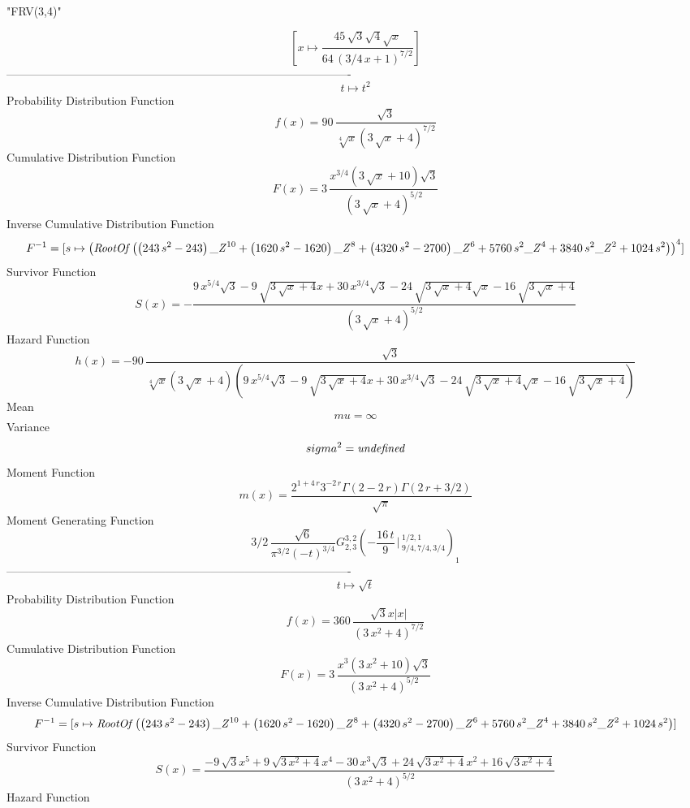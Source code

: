 \documentclass[12pt]{article}
\begin{document}
 
                                 "FRV(3,4)"

$$[x\mapsto {\frac {45\,\sqrt {3}\sqrt {4}\sqrt {x}}{64\, \left( 3/4\,x+
1 \right) ^{7/2}}}]
$$-------------------------------------------------------------------------------------------  \\$$t\mapsto {t}^{2}
$$Probability Distribution Function 
$$  f(x)=90\,{\frac {\sqrt {3}}{\sqrt [4]{x} \left( 3\,\sqrt {x}+4 \right) ^{7/
2}}}
$$Cumulative Distribution Function  
 $$F(x)=3\,{\frac {{x}^{3/4} \left( 3\,\sqrt {x}+10 \right) \sqrt {3}}{
 \left( 3\,\sqrt {x}+4 \right) ^{5/2}}}
$$ Inverse Cumulative Distribution Function 
  $$F^{-1} = [s\mapsto  \left( {\it RootOf} \left(  \left( 243\,{s}^{2}-243
 \right) {{\it \_Z}}^{10}+ \left( 1620\,{s}^{2}-1620 \right) {{\it \_Z
}}^{8}+ \left( 4320\,{s}^{2}-2700 \right) {{\it \_Z}}^{6}+5760\,{s}^{2
}{{\it \_Z}}^{4}+3840\,{s}^{2}{{\it \_Z}}^{2}+1024\,{s}^{2} \right) 
 \right) ^{4}]
$$Survivor Function 
 $$ S(x)=-{\frac {9\,{x}^{5/4}\sqrt {3}-9\,\sqrt {3\,\sqrt {x}+4}x+30\,{x}^{3/4
}\sqrt {3}-24\,\sqrt {3\,\sqrt {x}+4}\sqrt {x}-16\,\sqrt {3\,\sqrt {x}
+4}}{ \left( 3\,\sqrt {x}+4 \right) ^{5/2}}}
$$ Hazard Function 
 $$ h(x)=-90\,{\frac {\sqrt {3}}{\sqrt [4]{x} \left( 3\,\sqrt {x}+4 \right) 
 \left( 9\,{x}^{5/4}\sqrt {3}-9\,\sqrt {3\,\sqrt {x}+4}x+30\,{x}^{3/4}
\sqrt {3}-24\,\sqrt {3\,\sqrt {x}+4}\sqrt {x}-16\,\sqrt {3\,\sqrt {x}+
4} \right) }}
$$Mean 
 $$ mu=\infty 
$$ Variance 
 $$ sigma^2 = {\it undefined}
$$Moment Function 
 $$ m(x) = {\frac {{2}^{1+4\,r}{3}^{-2\,r}\Gamma \left( 2-2\,r \right) \Gamma
 \left( 2\,r+3/2 \right) }{\sqrt {\pi}}}
$$ Moment Generating Function 
 $$3/2\,{\frac {\sqrt {6}}{{\pi}^{3/2} \left( -t \right) ^{3/4}}
G^{3, 2}_{2, 3}\left(-{\frac {16\,t}{9}}\, \Big\vert\,^{1/2, 1}_{9/4, 7/4, 3/4}\right)
}_{{1}}
$$-------------------------------------------------------------------------------------------  \\$$t\mapsto \sqrt {t}
$$Probability Distribution Function 
$$  f(x)=360\,{\frac {\sqrt {3}x \left| x \right| }{ \left( 3\,{x}^{2}+4
 \right) ^{7/2}}}
$$Cumulative Distribution Function  
 $$F(x)=3\,{\frac {{x}^{3} \left( 3\,{x}^{2}+10 \right) \sqrt {3}}{ \left( 3\,
{x}^{2}+4 \right) ^{5/2}}}
$$ Inverse Cumulative Distribution Function 
  $$F^{-1} = [s\mapsto {\it RootOf} \left(  \left( 243\,{s}^{2}-243 \right) {{\it 
\_Z}}^{10}+ \left( 1620\,{s}^{2}-1620 \right) {{\it \_Z}}^{8}+ \left( 
4320\,{s}^{2}-2700 \right) {{\it \_Z}}^{6}+5760\,{s}^{2}{{\it \_Z}}^{4
}+3840\,{s}^{2}{{\it \_Z}}^{2}+1024\,{s}^{2} \right) ]
$$Survivor Function 
 $$ S(x)={\frac {-9\,\sqrt {3}{x}^{5}+9\,\sqrt {3\,{x}^{2}+4}{x}^{4}-30\,{x}^{3
}\sqrt {3}+24\,\sqrt {3\,{x}^{2}+4}{x}^{2}+16\,\sqrt {3\,{x}^{2}+4}}{
 \left( 3\,{x}^{2}+4 \right) ^{5/2}}}
$$ Hazard Function 
\end{document}
